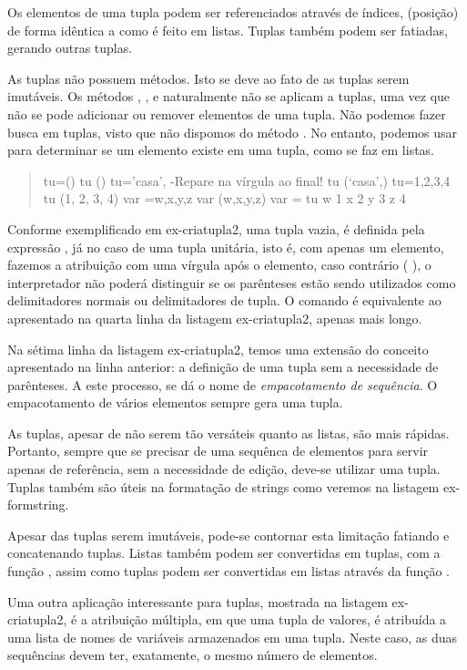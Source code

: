 \documentclass[a4paper,10pt,brazil]{sphinxmanual}
\begin{document}
Os elementos de uma tupla podem ser referenciados através de
índices, (posição) de forma idêntica a como é feito em listas.
Tuplas também podem ser fatiadas, gerando outras tuplas.

As tuplas não possuem métodos. Isto se deve ao fato de as tuplas
serem imutáveis. Os métodos , , e 
naturalmente não se aplicam a tuplas, uma vez que não se pode
adicionar ou remover elementos de uma tupla. Não podemos fazer
busca em tuplas, visto que não dispomos do método . No
entanto, podemos usar  para determinar se um elemento existe
em uma tupla, como se faz em listas.
\begin{quote}

tu=() tu () tu='casa', -Repare na vírgula ao final! tu (`casa',)
tu=1,2,3,4 tu (1, 2, 3, 4) var =w,x,y,z var (w,x,y,z) var = tu w 1
x 2 y 3 z 4
\end{quote}

Conforme exemplificado em ex-criatupla2, uma tupla vazia, é
definida pela expressão \code{()}, já no caso de uma tupla unitária,
isto é, com apenas um elemento, fazemos a atribuição com uma
vírgula após o elemento, caso contrário ( ), o
interpretador não poderá distinguir se os parênteses estão sendo
utilizados como delimitadores normais ou delimitadores de tupla. O
comando  é equivalente ao apresentado na quarta
linha da listagem ex-criatupla2, apenas mais longo.

Na sétima linha da listagem ex-criatupla2, temos uma extensão do
conceito apresentado na linha anterior: a definição de uma tupla
sem a necessidade de parênteses. A este processo, se dá o nome de
\emph{empacotamento de sequência}. O empacotamento de vários elementos
sempre gera uma tupla.

As tuplas, apesar de não serem tão versáteis quanto as listas, são
mais rápidas. Portanto, sempre que se precisar de uma sequênca de
elementos para servir apenas de referência, sem a necessidade de
edição, deve-se utilizar uma tupla. Tuplas também são úteis na
formatação de strings como veremos na listagem ex-formstring.

Apesar das tuplas serem imutáveis, pode-se contornar esta limitação
fatiando e concatenando tuplas. Listas também podem ser convertidas
em tuplas, com a função , assim como tuplas podem
ser convertidas em listas através da função .

Uma outra aplicação interessante para tuplas, mostrada na listagem
ex-criatupla2, é a atribuição múltipla, em que uma tupla de
valores, é atribuída a uma lista de nomes de variáveis armazenados
em uma tupla. Neste caso, as duas sequências devem ter, exatamente,
o mesmo número de elementos.
\end{document}
